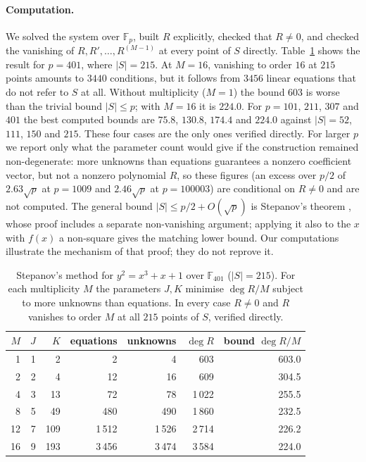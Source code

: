 \documentclass[11pt,a4paper]{article}
\theoremstyle{definition}\newtheorem{definition}[proposition]{Definition}
\theoremstyle{remark}\newtheorem{remark}[proposition]{Remark}
\begin{document}
\paragraph{Computation.} We solved the system over $\mathbb F_p$, built $R$ explicitly, checked that $R\neq0$, and checked the vanishing of $R,R',\dots,R^{(M-1)}$ at every point of $S$ directly. Table~\ref{tab:stepanov} shows the result for $p=401$, where $|S|=215$. At $M=16$, vanishing to order $16$ at $215$ points amounts to $3440$ conditions, but it follows from $3456$ linear equations that do not refer to $S$ at all. Without multiplicity ($M=1$) the bound $603$ is worse than the trivial bound $|S|\le p$; with $M=16$ it is $224.0$. For $p=101$, $211$, $307$ and $401$ the best computed bounds are $75.8$, $130.8$, $174.4$ and $224.0$ against $|S|=52$, $111$, $150$ and $215$. These four cases are the only ones verified directly. For larger $p$ we report only what the parameter count would give if the construction remained non-degenerate: more unknowns than equations guarantees a nonzero coefficient vector, but not a nonzero polynomial $R$, so these figures (an excess over $p/2$ of $2.63\sqrt p$ at $p=1009$ and $2.46\sqrt p$ at $p=100003$) are conditional on $R\neq0$ and are not computed. The general bound $|S|\le p/2+O(\sqrt p)$ is Stepanov's theorem \cite{Stepanov1969,Bombieri1974}, whose proof includes a separate non-vanishing argument; applying it also to the $x$ with $f(x)$ a non-square gives the matching lower bound. Our computations illustrate the mechanism of that proof; they do not reprove it.

\begin{table}[ht]\centering\small
\caption{Stepanov's method for $y^2=x^3+x+1$ over $\mathbb F_{401}$ ($|S|=215$). For each multiplicity $M$ the parameters $J,K$ minimise $\deg R/M$ subject to more unknowns than equations. In every case $R\neq0$ and $R$ vanishes to order $M$ at all $215$ points of $S$, verified directly.}\label{tab:stepanov}
\begin{tabular}{rrrrrrr}
\toprule
$M$ & $J$ & $K$ & equations & unknowns & $\deg R$ & bound $\deg R/M$\\
\midrule
1 & 1 & 2 & 2 & 4 & 603 & 603.0\\
2 & 2 & 4 & 12 & 16 & 609 & 304.5\\
4 & 3 & 13 & 72 & 78 & 1\,022 & 255.5\\
8 & 5 & 49 & 480 & 490 & 1\,860 & 232.5\\
12 & 7 & 109 & 1\,512 & 1\,526 & 2\,714 & 226.2\\
16 & 9 & 193 & 3\,456 & 3\,474 & 3\,584 & 224.0\\
\bottomrule
\end{tabular}
\end{table}
\end{document}

